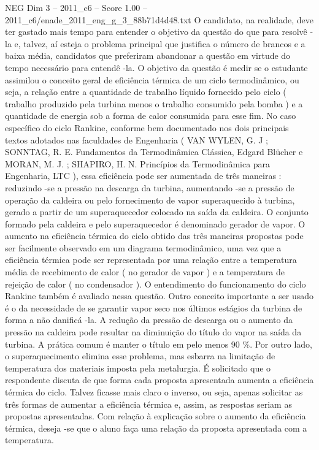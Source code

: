 \begin{textsample}{NEG Dim 3 – 2011\_c6 – Score 1.00 – 2011\_c6/enade\_2011\_eng\_g\_3\_88b71d4d48.txt}
O candidato, na realidade, deve ter gastado mais tempo para entender o objetivo da questão do que para resolvê -la e, talvez, aí esteja o problema principal que justifica o número de brancos e a baixa média, candidatos que preferiram abandonar a questão em virtude do tempo necessário para entendê -la.
O objetivo da questão é medir se o estudante assimilou o conceito geral de eficiência térmica de um ciclo termodinâmico, ou seja, a relação entre a quantidade de trabalho líquido fornecido pelo ciclo ( trabalho produzido pela turbina menos o trabalho consumido pela bomba ) e a quantidade de energia sob a forma de calor consumida para esse fim.
No caso específico do ciclo Rankine, conforme bem documentado nos dois principais textos adotados nas faculdades de Engenharia ( VAN WYLEN, G.
J ; SONNTAG, R.
E.
Fundamentos da Termodinâmica Clássica, Edgard Blücher e MORAN, M.
J. ; SHAPIRO, H.
N.
Princípios da Termodinâmica para Engenharia, LTC ), essa eficiência pode ser aumentada de três maneiras : reduzindo -se a pressão na descarga da turbina, aumentando -se a pressão de operação da caldeira ou pelo fornecimento de vapor superaquecido à turbina, gerado a partir de um superaquecedor colocado na saída da caldeira.
O conjunto formado pela caldeira e pelo superaquecedor é denominado gerador de vapor.
O aumento na eficiência térmica do ciclo obtido das três maneiras propostas pode ser facilmente observado em um diagrama termodinâmico, uma vez que a eficiência térmica pode ser representada por uma relação entre a temperatura média de recebimento de calor ( no gerador de vapor ) e a temperatura de rejeição de calor ( no condensador ).
O entendimento do funcionamento do ciclo Rankine também é avaliado nessa questão.
Outro conceito importante a ser usado é o da necessidade de se garantir vapor seco nos últimos estágios da turbina de forma a não danificá -la.
A redução da pressão de descarga ou o aumento da pressão na caldeira pode resultar na diminuição do título do vapor na saída da turbina.
A prática comum é manter o título em pelo menos 90 \%.
Por outro lado, o superaquecimento elimina esse problema, mas esbarra na limitação de temperatura dos materiais imposta pela metalurgia.
É solicitado que o respondente discuta de que forma cada proposta apresentada aumenta a eficiência térmica do ciclo.
Talvez ficasse mais claro o inverso, ou seja, apenas solicitar as três formas de aumentar a eficiência térmica e, assim, as respostas seriam as propostas apresentadas.
Com relação à explicação sobre o aumento da eficiência térmica, deseja -se que o aluno faça uma relação da proposta apresentada com a temperatura.

\end{textsample}
